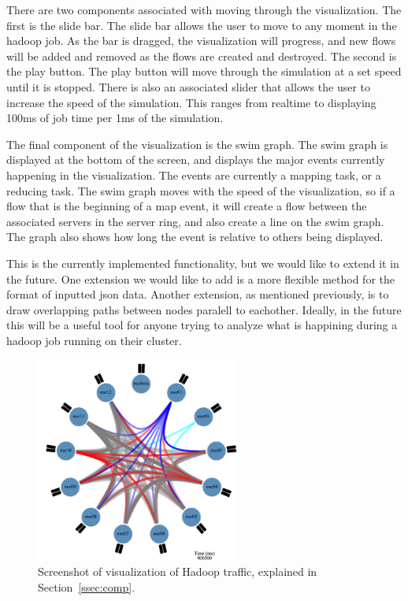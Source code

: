 There are two components associated with moving through the
visualization. The first is the slide bar. The slide bar allows the
user to move to any moment in the hadoop job. As the bar is dragged,
the visualization will progress, and new flows will be added and
removed as the flows are created and destroyed. The second is the play
button. The play button will move through the simulation at a set
speed until it is stopped. There is also an associated slider that
allows the user to increase the speed of the simulation. This ranges
from realtime to displaying 100ms of job time per 1ms of the
simulation.

The final component of the visualization is the swim graph. The swim
graph is displayed at the bottom of the screen, and displays the major
events currently happening in the visualization. The events are
currently a mapping task, or a reducing task. The swim graph moves
with the speed of the visualization, so if a flow that is the
beginning of a map event, it will create a flow between the associated
servers in the server ring, and also create a line on the swim graph.
The graph also shows how long the event is relative to others being
displayed.

This is the currently implemented functionality, but we would like to
extend it in the future. One extension we would like to add is a more
flexible method for the format of inputted json data. Another
extension, as mentioned previously, is to draw overlapping paths
between nodes paralell to eachother. Ideally, in the future this will
be a useful tool for anyone trying to analyze what is happining during
a hadoop job running on their cluster.

\begin{figure}
\centering
\includegraphics[width=0.6\textwidth]{figures/hadoop-viz.png}
\caption{Screenshot of visualization of Hadoop traffic, explained in Section~\ref{ssec:comp}.}
\label{fig:viz}
\end{figure}
